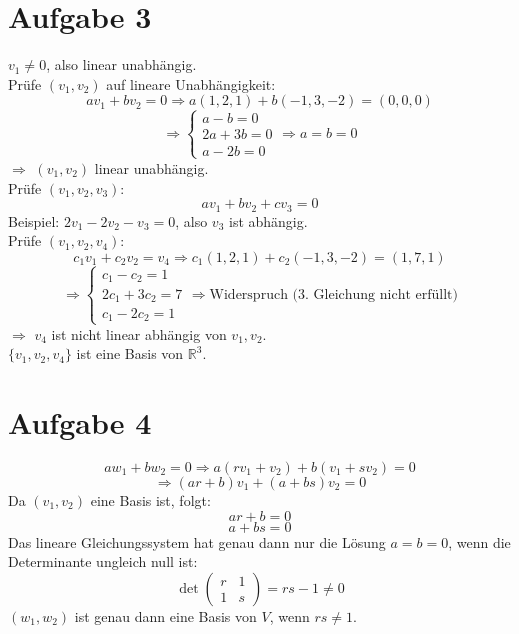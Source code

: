 \documentclass{article}
\begin{document}
\section*{Aufgabe 3}
$v_1 \neq 0$, also linear unabhängig. \\
Prüfe $(v_1, v_2)$ auf lineare Unabhängigkeit:
\[a v_1 + b v_2 = 0 \Rightarrow a(1,2,1) + b(-1,3,-2) = (0,0,0)\]
\[\Rightarrow \begin{cases} a - b = 0 \\ 2a + 3b = 0 \\ a - 2b = 0 \end{cases} \Rightarrow a = b = 0\]
$\Rightarrow$ $(v_1, v_2)$ linear unabhängig. \\
Prüfe $(v_1, v_2, v_3)$:
\[a v_1 + b v_2 + c v_3 = 0\]
Beispiel: $2v_1 - 2v_2 - v_3 = 0$, also $v_3$ ist abhängig. \\
Prüfe $(v_1, v_2, v_4)$:
\[c_1 v_1 + c_2 v_2 = v_4 \Rightarrow c_1(1,2,1) + c_2(-1,3,-2) = (1,7,1)\]
\[\Rightarrow \begin{cases} c_1 - c_2 = 1 \\ 2c_1 + 3c_2 = 7 \\ c_1 - 2c_2 = 1 \end{cases} \Rightarrow \text{Widerspruch (3. Gleichung nicht erfüllt)}\]
$\Rightarrow$ $v_4$ ist nicht linear abhängig von $v_1, v_2$. \\
$\{v_1, v_2, v_4\}$ ist eine Basis von $\mathbb{R}^3$.

\section*{Aufgabe 4}
\[a w_1 + b w_2 = 0 \Rightarrow a(r v_1 + v_2) + b(v_1 + s v_2) = 0\]
\[\Rightarrow (a r + b) v_1 + (a + b s) v_2 = 0\]
Da $(v_1, v_2)$ eine Basis ist, folgt:
\[a r + b = 0\] 
\[ a + b s = 0\]
Das lineare Gleichungssystem hat genau dann nur die Lösung $a = b = 0$, wenn die Determinante ungleich null ist:
\[\det \begin{pmatrix} r & 1 \\ 1 & s \end {pmatrix}= rs - 1 \neq 0\]
$(w_1, w_2)$ ist genau dann eine Basis von $V$, wenn $rs \neq 1$.
\end{document}
